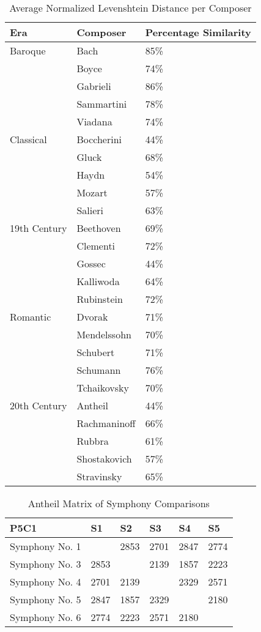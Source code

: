 \begin{longtable}{|l|l|l|}
\caption{Average Normalized Levenshtein Distance per Composer}
\label{my-label}\\
\hline
Era & Composer & Percentage Similarity \\ \hline
\endfirsthead
%
\endhead
%
Baroque & Bach & 85\% \\ \hline
 & Boyce & 74\% \\ \hline
 & Gabrieli & 86\% \\ \hline
 & Sammartini & 78\% \\ \hline
 & Viadana & 74\% \\ \hline
Classical & Boccherini & 44\% \\ \hline
 & Gluck & 68\% \\ \hline
 & Haydn & 54\% \\ \hline
 & Mozart & 57\% \\ \hline
 & Salieri & 63\% \\ \hline
19th Century & Beethoven & 69\% \\ \hline
 & Clementi & 72\% \\ \hline
 & Gossec & 44\% \\ \hline
 & Kalliwoda & 64\% \\ \hline
 & Rubinstein & 72\% \\ \hline
Romantic & Dvorak & 71\% \\ \hline
 & Mendelssohn & 70\% \\ \hline
 & Schubert & 71\% \\ \hline
 & Schumann & 76\% \\ \hline
 & Tchaikovsky & 70\% \\ \hline
20th Century & Antheil & 44\% \\ \hline
 & Rachmaninoff & 66\% \\ \hline
 & Rubbra & 61\% \\ \hline
 & Shostakovich & 57\% \\ \hline
 & Stravinsky & 65\% \\ \hline
\end{longtable}

\begin{longtable}{|l|l|l|l|l|l|}
\caption{Antheil Matrix of Symphony Comparisons}
\label{my-label}\\
\hline
P5C1 & S1 & S2 & S3 & S4 & S5 \\ \hline
\endfirsthead
%
\endhead
%
Symphony No. 1 &  & 2853 & 2701 & 2847 & 2774 \\ \hline
Symphony No. 3 & 2853 &  & 2139 & 1857 & 2223 \\ \hline
Symphony No. 4 & 2701 & 2139 &  & 2329 & 2571 \\ \hline
Symphony No. 5 & 2847 & 1857 & 2329 &  & 2180 \\ \hline
Symphony No. 6 & 2774 & 2223 & 2571 & 2180 &  \\ \hline
\end{longtable}

